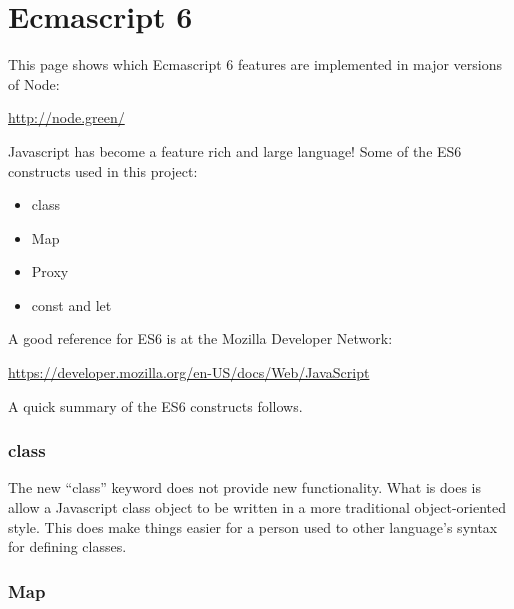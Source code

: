 %
%
%

\chapter{Ecmascript 6}

This page shows which Ecmascript 6 features are implemented in major versions
of Node:

\url{http://node.green/}

Javascript has become a feature rich and large language!
Some of the ES6 constructs used in this project:

\begin{itemize}
\item class
\item Map
\item Proxy
\item const and let
\end{itemize}

A good reference for ES6 is at the Mozilla Developer Network:

\url{https://developer.mozilla.org/en-US/docs/Web/JavaScript}

A quick summary of the ES6 constructs follows.

\subsection{class}

The new ``class'' keyword does not provide new functionality.  What is does is 
allow a Javascript class object to be written in a more traditional 
object-oriented style.  This does make things easier for a person used to other 
language's syntax for defining classes.

\subsection{Map}

